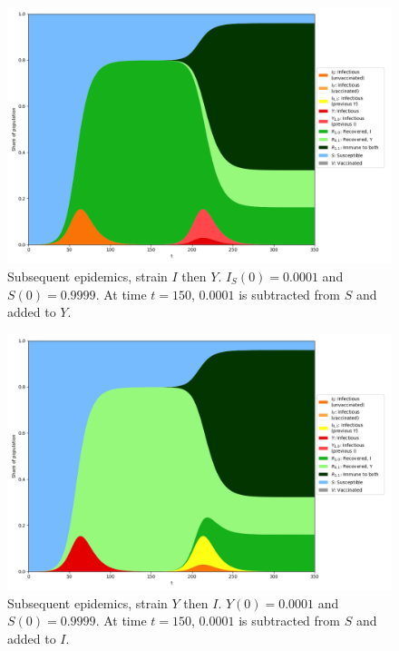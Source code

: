 \documentclass[10pt,a4paper]{article}
\begin{document}
\begin{figure}[ht]\centering
    \includegraphics[width=0.9\linewidth]{../Figures/TwoStrainModel_IthenY.png}
    \caption{Subsequent epidemics, strain $I$ then $Y$. $I_S(0)=0.0001$ and $S(0)=0.9999$. At time $t=150$, $0.0001$ is subtracted from $S$ and added to $Y$.}
\end{figure}
\begin{figure}[ht]\centering
    \includegraphics[width=0.9\linewidth]{../Figures/TwoStrainModel_YthenI.png}
    \caption{Subsequent epidemics, strain $Y$ then $I$. $Y(0)=0.0001$ and $S(0)=0.9999$. At time $t=150$, $0.0001$ is subtracted from $S$ and added to $I$.}
\end{figure}
\end{document}
